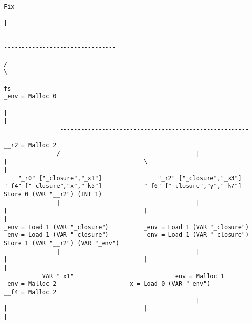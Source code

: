 \begin{landscape}
\begin{lstlisting}[basicstyle=\fontsize{6.5}{7.5}\selectfont\ttfamily]
                                                                                                    Fix
                                                                                                     |
                                                                                ------------------------------------------------------------------------------------------------------
                                                                               /                                                                                                      \
                                                                               fs                                                                                              _env = Malloc 0
                                                                               |                                                                                                      |
                ----------------------------------------------------------------------------------------------------------------------------                                   __r2 = Malloc 2
               /                                       |                                            |                                       \                                         |
    "_r0" ["_closure","_x1"]                "_r2" ["_closure","_x3"]                   "_f4" ["_closure","x","_k5"]            "_f6" ["_closure","y","_k7"]              Store 0 (VAR "__r2") (INT 1)
               |                                       |                                            |                                       |                                         |
_env = Load 1 (VAR "_closure")          _env = Load 1 (VAR "_closure")               _env = Load 1 (VAR "_closure")          _env = Load 1 (VAR "_closure")           Store 1 (VAR "__r2") (VAR "_env")
               |                                       |                                            |                                       |                                         |
           VAR "_x1"                            _env = Malloc 1                              _env = Malloc 2                     x = Load 0 (VAR "_env")                       __f4 = Malloc 2
                                                       |                                            |                                       |                                         |

\end{lstlisting}
\end{landscape}
